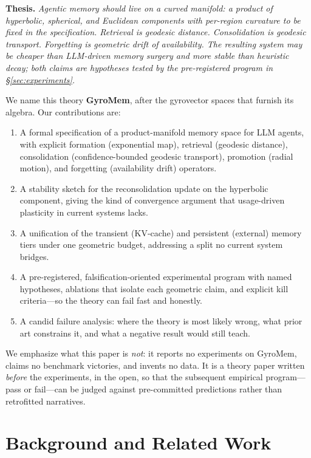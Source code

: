 \documentclass[11pt,a4paper]{article}
\begin{document}
\textbf{Thesis.} \emph{Agentic memory should live on a curved manifold: a
product of hyperbolic, spherical, and Euclidean components with
per-region curvature to be fixed in the specification. Retrieval is geodesic
distance. Consolidation is geodesic transport. Forgetting is geometric
drift of availability. The resulting system may be cheaper than LLM-driven
memory surgery and more stable than heuristic decay; both claims are
hypotheses tested by the pre-registered program in
\S\ref{sec:experiments}.}

We name this theory \textbf{GyroMem}, after the gyrovector spaces that
furnish its algebra. Our contributions are:

\begin{enumerate}[leftmargin=*]
\item A formal specification of a product-manifold memory space for LLM
agents, with explicit formation (exponential map), retrieval (geodesic
distance), consolidation (confidence-bounded geodesic transport),
promotion (radial motion), and forgetting (availability drift) operators.
\item A stability sketch for the reconsolidation update on the hyperbolic
component, giving the kind of convergence argument that usage-driven
plasticity in current systems lacks.
\item A unification of the transient (KV-cache) and persistent (external)
memory tiers under one geometric budget, addressing a split no current
system bridges.
\item A pre-registered, falsification-oriented experimental program with
named hypotheses, ablations that isolate each geometric claim, and
explicit kill criteria---so the theory can fail fast and honestly.
\item A candid failure analysis: where the theory is most likely wrong,
what prior art constrains it, and what a negative result would still teach.
\end{enumerate}

We emphasize what this paper is \emph{not}: it reports no experiments on
GyroMem, claims no benchmark victories, and invents no data. It is a theory
paper written \emph{before} the experiments, in the open, so that the
subsequent empirical program---pass or fail---can be judged against
pre-committed predictions rather than retrofitted narratives.

\section{Background and Related Work}
\end{document}
